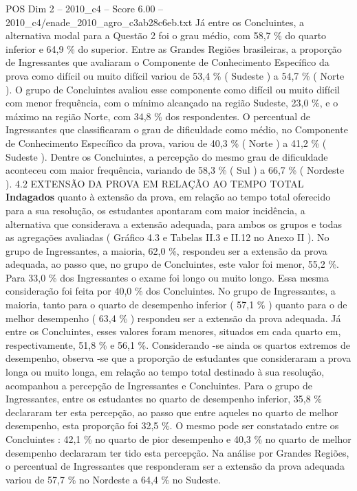 \begin{textsample}{POS Dim 2 – 2010\_c4 – Score 6.00 – 2010\_c4/enade\_2010\_agro\_c3ab28c6eb.txt}
Já entre os Concluintes, a alternativa modal para a Questão 2 foi o grau médio, com 58,7 \% do quarto inferior e 64,9 \% do superior.
Entre as Grandes Regiões brasileiras, a proporção de Ingressantes que avaliaram o Componente de Conhecimento Específico da prova como difícil ou muito difícil variou de 53,4 \% ( Sudeste ) a 54,7 \% ( Norte ).
O grupo de Concluintes avaliou esse componente como difícil ou muito difícil com menor frequência, com o mínimo alcançado na região Sudeste, 23,0 \%, e o máximo na região Norte, com 34,8 \% dos respondentes.
O percentual de Ingressantes que classificaram o grau de dificuldade como médio, no Componente de Conhecimento Específico da prova, variou de 40,3 \% ( Norte ) a 41,2 \% ( Sudeste ).
Dentre os Concluintes, a percepção do mesmo grau de dificuldade aconteceu com maior frequência, variando de 58,3 \% ( Sul ) a 66,7 \% ( Nordeste ). 4.2 EXTENSÃO DA PROVA EM RELAÇÃO AO TEMPO TOTAL \textbf{Indagados} quanto à extensão da prova, em relação ao tempo total oferecido para a sua resolução, os estudantes apontaram com maior incidência, a alternativa que considerava a extensão adequada, para ambos os grupos e todas as agregações avaliadas ( Gráfico 4.3 e Tabelas II.3 e II.12 no Anexo II ).
No grupo de Ingressantes, a maioria, 62,0 \%, respondeu ser a extensão da prova adequada, ao passo que, no grupo de Concluintes, este valor foi menor, 55,2 \%.
Para 33,0 \% dos Ingressantes o exame foi longo ou muito longo.
Essa mesma consideração foi feita por 40,0 \% dos Concluintes.
No grupo de Ingressantes, a maioria, tanto para o quarto de desempenho inferior ( 57,1 \% ) quanto para o de melhor desempenho ( 63,4 \% ) respondeu ser a extensão da prova adequada.
Já entre os Concluintes, esses valores foram menores, situados em cada quarto em, respectivamente, 51,8 \% e 56,1 \%.
Considerando -se ainda os quartos extremos de desempenho, observa -se que a proporção de estudantes que consideraram a prova longa ou muito longa, em relação ao tempo total destinado à sua resolução, acompanhou a percepção de Ingressantes e Concluintes.
Para o grupo de Ingressantes, entre os estudantes no quarto de desempenho inferior, 35,8 \% declararam ter esta percepção, ao passo que entre aqueles no quarto de melhor desempenho, esta proporção foi 32,5 \%.
O mesmo pode ser constatado entre os Concluintes : 42,1 \% no quarto de pior desempenho e 40,3 \% no quarto de melhor desempenho declararam ter tido esta percepção.
Na análise por Grandes Regiões, o percentual de Ingressantes que responderam ser a extensão da prova adequada variou de 57,7 \% no Nordeste a 64,4 \% no Sudeste.

\end{textsample}
